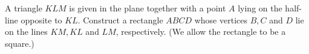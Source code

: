 A triangle $KLM$ is given in the plane together with a point $A$ lying on the half-line opposite to $KL$. Construct a rectangle $ABCD$ whose vertices $B, C$ and $D$ lie on the lines $KM, KL$ and $LM$, respectively. (We allow the rectangle to be a square.)